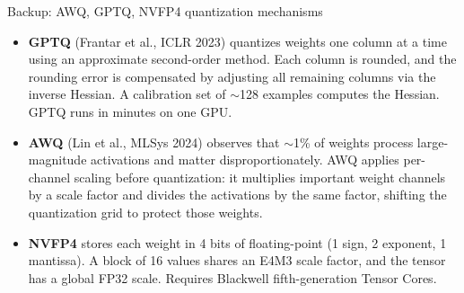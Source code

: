 \documentclass[aspectratio=169,10pt]{beamer}
\newcommand{\llmbase}{%
  \node[llmbox] (PF) at (0, 0) {Prefill};
  \node[llmbox] (KV) at (1.05, 0) {KV};
  \node[llmbox] (DC) at (1.95, 0) {Decode};
  \node[llmbox] (WP) at (0, -0.45) {Weights};
  \node[llmbox] (WD) at (1.95, -0.45) {Weights};
  \draw[llmar] (PF)--(KV); \draw[llmar] (KV)--(DC);
  \draw[llmar] (WP)--(PF); \draw[llmar] (WD)--(DC);
}
\newcommand{\llmoverlay}[1]{}  %
\newcommand{\llmdiagW}{\llmoverlay{\begin{tikzpicture}[scale=0.65]\llmbase
  \node[llmbox, llmhl] at (0,-0.45) {Weights};
  \node[llmbox, llmhl] at (1.95,-0.45) {Weights};\end{tikzpicture}}}
\begin{document}
\begin{frame}{Backup: AWQ, GPTQ, NVFP4 quantization mechanisms}
  \llmdiagW
  \vspace{-0.2em}
  \small
  \begin{itemize}\setlength{\itemsep}{0.6em}
    \item \textbf{GPTQ} (Frantar et al., ICLR 2023) quantizes weights one
          column at a time using an approximate second-order method. Each
          column is rounded, and the rounding error is compensated by
          adjusting all remaining columns via the inverse Hessian. A
          calibration set of $\sim$128 examples computes the Hessian.
          GPTQ runs in minutes on one GPU.
    \item \textbf{AWQ} (Lin et al., MLSys 2024) observes that $\sim$1\% of
          weights process large-magnitude activations and matter
          disproportionately. AWQ applies per-channel scaling before
          quantization: it multiplies important weight channels by a scale
          factor and divides the activations by the same factor, shifting
          the quantization grid to protect those weights.
    \item \textbf{NVFP4} stores each weight in 4 bits of floating-point
          (1 sign, 2 exponent, 1 mantissa). A block of 16 values shares
          an E4M3 scale factor, and the tensor has a global FP32 scale.
          Requires Blackwell fifth-generation Tensor Cores.
  \end{itemize}
\end{frame}
\end{document}
